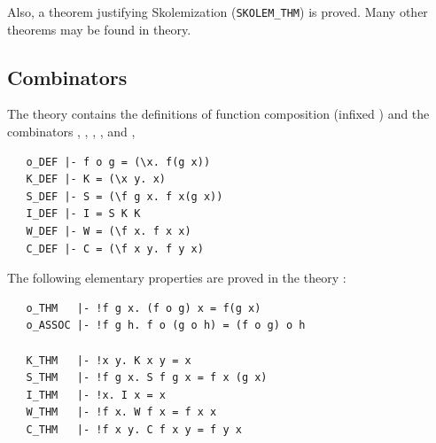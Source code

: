 Also, a theorem justifying Skolemization ({\small\verb+SKOLEM_THM+}) is
proved. Many other theorems may be found in  theory.


\subsection{Combinators}
\label{sec:combinTheory}


The theory 
contains the definitions of function composition (infixed )
and the combinators
,
,
,
,
and ,

\begin{hol}
\begin{verbatim}
   o_DEF |- f o g = (\x. f(g x))
   K_DEF |- K = (\x y. x)
   S_DEF |- S = (\f g x. f x(g x))
   I_DEF |- I = S K K
   W_DEF |- W = (\f x. f x x)
   C_DEF |- C = (\f x y. f y x)
\end{verbatim}
\end{hol}

\noindent The following elementary properties are proved in the theory
:

\begin{hol}
\begin{verbatim}
   o_THM   |- !f g x. (f o g) x = f(g x)
   o_ASSOC |- !f g h. f o (g o h) = (f o g) o h

   K_THM   |- !x y. K x y = x
   S_THM   |- !f g x. S f g x = f x (g x)
   I_THM   |- !x. I x = x
   W_THM   |- !f x. W f x = f x x
   C_THM   |- !f x y. C f x y = f y x
\end{verbatim}
\end{hol}

